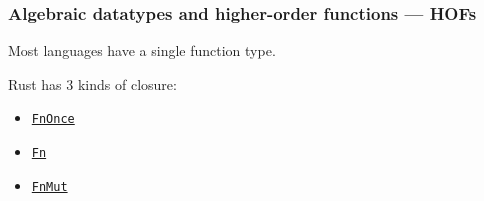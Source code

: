 \documentclass[t]{beamer}
\begin{document}
\begin{frame}[c,fragile]
\frametitle{Algebraic datatypes and higher-order functions --- HOFs}
\begin{comment}
Most languages have a single function type. Rust has more. There are 3 kinds of
closure: FnOnce, Fn, and FnMut. I won't explain what they mean right now.
Let me just say: they are all justified in the context of Rusts goals of safety and
performance. The price of achieving these goals for closures in Rust is simplicity:
when you write a higher-order function, you need to figure out which kind of
higher-order function is most appropriate.
\end{comment}

Most languages have a single function type.

\bigskip

Rust has 3 kinds of closure:

\begin{itemize}
\item \href{https://doc.rust-lang.org/std/ops/trait.FnOnce.html}{\texttt{FnOnce}}
\item \href{https://doc.rust-lang.org/std/ops/trait.Fn.html}{\texttt{Fn}}
\item \href{https://doc.rust-lang.org/std/ops/trait.FnMut.html}{\texttt{FnMut}}
\end{itemize}

\end{frame}
\end{document}

